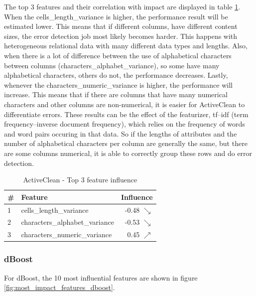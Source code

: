The top 3 features and their correlation with impact are displayed in table \ref{tab:top_influence_features_activeclean}. When the cells\_length\_variance is higher, the performance result will be estimated lower. This means that if different columns, have different content sizes, the error detection job most likely becomes harder. This happens with heterogeneous relational data with many different data types and lengths. Also, when there is a lot of difference between the use of alphabetical characters between columns (characters\_alphabet\_variance), so some have many alphabetical characters, others do not, the performance decreases. Lastly, whenever the characters\_numeric\_variance is higher, the performance will increase. This means that if there are columns that have many numerical characters and other columns are non-numerical, it is easier for ActiveClean to differentiate errors. These results can be the effect of the featurizer, tf–idf (term frequency–inverse document frequency), which relies on the frequency of words and word pairs occuring in that data. So if the lengths of attributes and the number of alphabetical characters per column are generally the same, but there are some columns numerical, it is able to correctly group these rows and do error detection.

\begin{table}[H]
\centering
\begin{tabular}{llr}
\toprule
 \# &                         Feature &         Influence \\
\midrule
 1 &         cells\_length\_variance &  -0.48 $\searrow$ \\
 2 &  characters\_alphabet\_variance &  -0.53 $\searrow$ \\
 3 &   characters\_numeric\_variance &   0.45 $\nearrow$ \\
\bottomrule
\end{tabular}
\caption{ActiveClean - Top 3 feature influence}
\label{tab:top_influence_features_activeclean}
\end{table}


\subsubsection{dBoost}
For dBoost, the 10 most influential features are shown in figure \ref{fig:most_impact_features_dboost}. 

